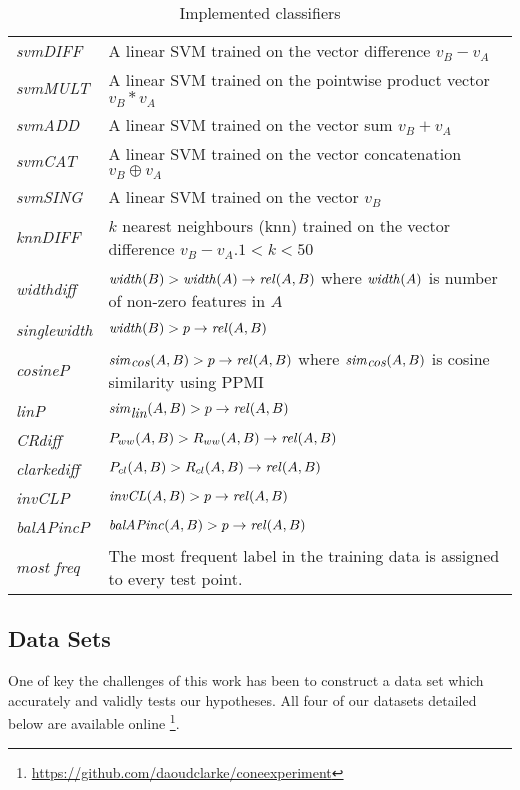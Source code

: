 \documentclass[11pt]{article}
\newcommand\invCL[1]{\mbox{\em invCL\/}(#1)}
\newcommand\simcos[1]{\mbox{\em sim\/}_{\mbox{\em cos}}(#1)}
\newcommand\simlin[1]{\mbox{\em sim\/}_{\mbox{\em lin}}(#1)}
\newcommand\width[1]{\mbox{\em width\/}(#1)}
\newcommand\balapinc[1]{\mbox{\em balAPinc\/}(#1)}
\newcommand\rel[1]{\mbox{\em rel\/}(#1)}
\begin{document}
\begin{table*}[ht]
\centering
\begin{tabular}{|l|p{14cm}|}
\hline
\emph{svmDIFF}& A linear SVM trained on the vector difference $v_B - v_A$\\
\emph{svmMULT}& A linear SVM trained on the pointwise product vector $v_B * v_A$\\
\emph{svmADD}& A linear SVM trained on the vector sum $v_B + v_A$\\
\emph{svmCAT}& A linear SVM trained on the vector concatenation $v_B\oplus v_A$\\
\emph{svmSING}& A linear SVM trained on the vector $v_B$\\
\emph{knnDIFF}& $k$ nearest neighbours (knn) trained on the vector difference $v_B - v_A$.$1< k<50$\\
\hline
\emph{widthdiff}& $\width{B} > \width{A} \rightarrow\rel{A,B}$  where $\width{A}$ is  number of non-zero features in $A$\\
\emph{singlewidth}& $\width{B} > p \rightarrow \rel{A,B}$\\
\emph{cosineP}& $\simcos{A,B} > p \rightarrow\rel{A,B}$ where $\simcos{A,B}$ is cosine similarity using PPMI\\
\emph{linP}&$\simlin{A,B} > p \rightarrow\rel{A,B}$ \cite{Lin1998}\\
\emph{CRdiff}& $P_{ww}(A,B) > R_{ww}(A,B) \rightarrow\rel{A,B}$  \cite{Weeds2004}\\
\emph{clarkediff}&$P_{cl}(A,B) > R_{cl}(A,B) \rightarrow\rel{A,B}$  \cite{Clarke:09}\\
\emph{invCLP}&$\invCL{A,B} > p \rightarrow\rel{A,B}$  \cite{Lenci2012}\\
\emph{balAPincP}&$\balapinc{A,B} > p \rightarrow\rel{A,B}$ \cite{Kotlerman2010}\\
\emph{most freq}&The most frequent label in the training data is assigned to every test point.\\
\hline
\end{tabular}
\caption{Implemented classifiers}
\label{table:classifiers}
\end{table*}

\subsection{Data Sets}
\label{sect:data}

One of key the challenges of this work has been to construct a data set which accurately and validly tests our hypotheses.  All four of our datasets detailed below are available online \footnote{\url{https://github.com/daoudclarke/coneexperiment}}.
\end{document}
